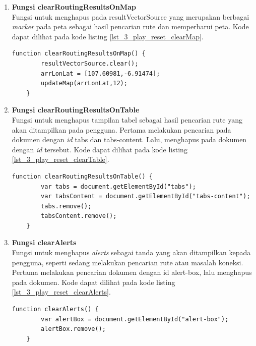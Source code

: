 \begin{enumerate}
	\item \textbf{Fungsi clearRoutingResultsOnMap}\\
	Fungsi untuk menghapus pada resultVectorSource yang merupakan berbagai \textit{marker} pada peta sebagai hasil pencarian rute dan memperbarui peta. Kode dapat dilihat pada kode listing \ref{lst_3_play_reset_clearMap}.
	\begin{lstlisting}[caption=Fungsi JavaScript untuk menghapus hasil pencarian rute pada peta ,label = {lst_3_play_reset_clearMap}]
	function clearRoutingResultsOnMap() {
		resultVectorSource.clear();
	    arrLonLat = [107.60981,-6.91474];
	    updateMap(arrLonLat,12);
	}
	\end{lstlisting}
	
	\item \textbf{Fungsi clearRoutingResultsOnTable}\\
	Fungsi untuk menghapus tampilan tabel sebagai hasil pencarian rute yang akan ditampilkan pada pengguna. Pertama melakukan pencarian pada dokumen dengan \textit{id} tabs dan tabs-content. Lalu, menghapus pada dokumen dengan \textit{id} tersebut. Kode dapat dilihat pada kode listing \ref{lst_3_play_reset_clearTable}.
	
	\begin{lstlisting}[caption=Fungsi JavaScript untuk menghapus tampilan tabel,label = {lst_3_play_reset_clearTable}]
	function clearRoutingResultsOnTable() {
		var tabs = document.getElementById("tabs");
	    var tabsContent = document.getElementById("tabs-content");
	    tabs.remove();
	    tabsContent.remove();
	}
	\end{lstlisting}
	
	\item \textbf{Fungsi clearAlerts}\\
	Fungsi untuk menghapus \textit{alerts} sebagai tanda yang akan ditampilkan kepada pengguna, seperti sedang melakukan pencarian rute atau masalah koneksi. Pertama melakukan pencarian dokumen dengan id alert-box, lalu menghapus pada dokumen. Kode dapat dilihat pada kode listing \ref{lst_3_play_reset_clearAlerts}.
	
	\begin{lstlisting}[caption=Fungsi JavaScript untuk menghilangkan \textit{alerts},label = {lst_3_play_reset_clearAlerts}]
	function clearAlerts() {
	    var alertBox = document.getElementById("alert-box");
	    alertBox.remove();
	}
	\end{lstlisting}
	

\end{enumerate}

